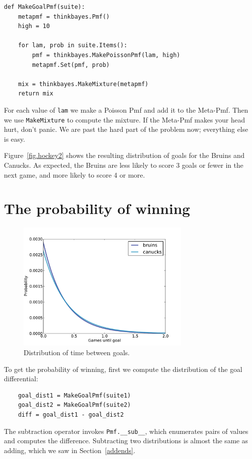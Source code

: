 \documentclass[12pt]{book}
\begin{document}
\begin{verbatim}
def MakeGoalPmf(suite):
    metapmf = thinkbayes.Pmf()
    high = 10

    for lam, prob in suite.Items():
        pmf = thinkbayes.MakePoissonPmf(lam, high)
        metapmf.Set(pmf, prob)

    mix = thinkbayes.MakeMixture(metapmf)
    return mix
\end{verbatim}  

For each value of {\tt lam} we make a Poisson Pmf and add it to the
Meta-Pmf.  Then we use \verb"MakeMixture" to compute the mixture.  If
the Meta-Pmf makes your head hurt, don't panic.  We are past the hard
part of the problem now; everything else is easy.

Figure~\ref{fig.hockey2} shows the resulting distribution of goals for
the Bruins and Canucks.  As expected, the Bruins are less likely to
score 3 goals or fewer in the next game, and more likely to score 4 or
more.


\section{The probability of winning}

\begin{figure}
\centerline{\includegraphics[height=2.5in]{figs/hockey3.pdf}}
\caption{Distribution of time between goals.}
\label{fig.hockey3}
\end{figure}

To get the probability of winning, first we compute the
distribution of the goal differential:

\begin{verbatim}
    goal_dist1 = MakeGoalPmf(suite1)
    goal_dist2 = MakeGoalPmf(suite2)
    diff = goal_dist1 - goal_dist2
\end{verbatim}  

The subtraction operator invokes \verb"Pmf.__sub__", which enumerates
pairs of values and computes the difference.  Subtracting two
distributions is almost the same as adding, which we saw in
Section~\ref{addends}.
\end{document}
